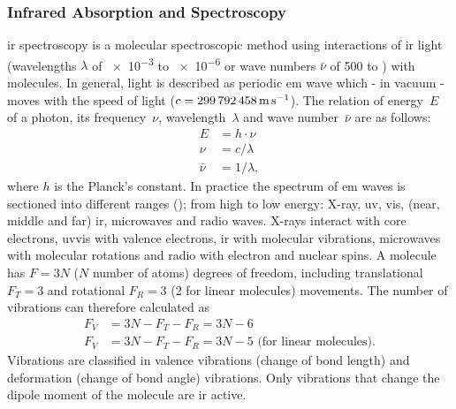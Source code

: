 \subsubsection{Infrared Absorption and Spectroscopy}
\Gls{ir} spectroscopy is a molecular spectroscopic method using interactions of \gls{ir} light (wavelengths $\lambda$ of \num{e-3} to \num{e-6}\m{}
or wave numbers $\bar{\nu}$ of 500 to  ) with molecules. \cite{Schwedt2008}
In general, light is described as periodic \gls{em} wave 
which - in vacuum - moves with the speed of light ($c = \SI{299792458}{\meter\per\second}$).
The relation of energy~$E$ of a photon, its frequency~$\nu$, wavelength~$\lambda$ and wave number~$\bar{\nu}$ are as follows:
\begin{align*}
	E &= h \cdot \nu \\
	\nu &= c/ \lambda \\
	\bar{\nu} &= 1/\lambda,
\end{align*}
where $h$ is the Planck's constant.
In practice the spectrum of \gls{em} waves is sectioned into different ranges ();
from high to low energy: X-ray, \gls{uv}, \gls{vis}, (near, middle and far) \gls{ir}, microwaves and radio waves. 
X-rays interact with core electrons, \gls{uv}\gls{vis} with valence electrons, \gls{ir} with molecular vibrations, microwaves with molecular rotations and radio with electron and nuclear spins. 
%
A molecule has $F=3N$ ($N$ number of atoms) degrees of freedom, including translational $F_T=3$ and rotational $F_R=3$ (2 for linear molecules) movements. 
%
The number of vibrations can therefore calculated as 
\begin{align*}
	F_V &= 3N - F_T - F_R = 3N - 6 \\
	F_V &= 3N - F_T - F_R = 3N - 5 \textrm{ (for linear molecules)}.
\end{align*}
Vibrations are classified in valence vibrations (change of bond length) and deformation (change of bond angle) vibrations\cite{Melker2006}. 
Only vibrations that change the dipole moment of the molecule are \gls{ir} active. 


